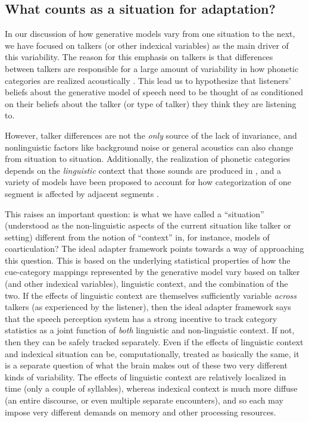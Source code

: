 \subsection{What counts as a situation for adaptation?}
\label{sec:index-situ-vers}

In our discussion of how generative models vary from one situation to the next, we have focused on talkers (or other indexical variables) as the main driver of this variability.  The reason for this emphasis on talkers is that differences between talkers are responsible for a large amount of variability in how phonetic categories are realized acoustically \autocite[among others]{Allen2003,Hillenbrand1995,McMurray2011a,Newman2001}.  This lead us to hypothesize that listeners' beliefs about the generative model of speech need to be thought of as conditioned on their beliefs about the talker (or type of talker) they think they are listening to.  

However, talker differences are not the \emph{only} source of the lack of invariance, and nonlinguistic factors like background noise or general acoustics can also change from situation to situation.  Additionally, the realization of phonetic categories depends on the \emph{linguistic} context that those sounds are produced in \autocite{Liberman1967}, and a variety of models have been proposed to account for how categorization of one segment is affected by adjacent segments \autocite{Massaro1987,Nearey1997,Nearey1986,Oden1978,Smits2001a,Sonderegger2010}.

This raises an important question: is what we have called a ``situation'' (understood as the non-linguistic aspects of the current situation like talker or setting) different from the notion of ``context'' in, for instance, models of coarticulation?  The ideal adapter framework points towards a way of approaching this question.  This is based on the underlying statistical properties of how the cue-category mappings represented by the generative model vary based on talker (and other indexical variables), linguistic context, and the combination of the two.  If the effects of linguistic context are themselves sufficiently variable \emph{across} talkers (as experienced by the listener), then the ideal adapter framework says that the speech perception system has a strong incentive to track category statistics as a joint function of \emph{both} linguistic and non-linguistic context.  If not, then they can be safely tracked separately.  
Even if the effects of linguistic context and indexical situation can be, computationally, treated as basically the same, it is a separate question of what the brain makes out of these two very different kinds of variability.  The effects of linguistic context are relatively localized in time (only a couple of syllables), whereas indexical context is much more diffuse (an entire discourse, or even multiple separate encounters), and so each may impose very different demands on memory and other processing resources.

